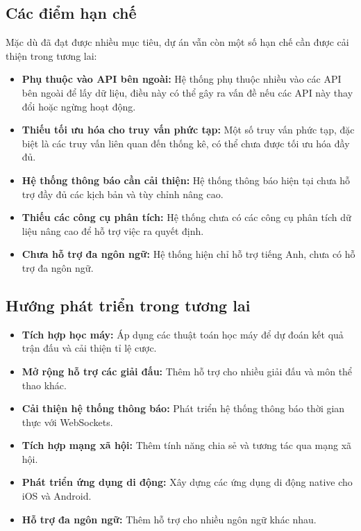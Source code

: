 \documentclass[a4paper,12pt]{report}
\begin{document}
\subsection{Các điểm hạn chế}

Mặc dù đã đạt được nhiều mục tiêu, dự án vẫn còn một số hạn chế cần được cải thiện trong tương lai:

\begin{itemize}
    \item \textbf{Phụ thuộc vào API bên ngoài:} Hệ thống phụ thuộc nhiều vào các API bên ngoài để lấy dữ liệu, điều này có thể gây ra vấn đề nếu các API này thay đổi hoặc ngừng hoạt động.
    \item \textbf{Thiếu tối ưu hóa cho truy vấn phức tạp:} Một số truy vấn phức tạp, đặc biệt là các truy vấn liên quan đến thống kê, có thể chưa được tối ưu hóa đầy đủ.
    \item \textbf{Hệ thống thông báo cần cải thiện:} Hệ thống thông báo hiện tại chưa hỗ trợ đầy đủ các kịch bản và tùy chỉnh nâng cao.
    \item \textbf{Thiếu các công cụ phân tích:} Hệ thống chưa có các công cụ phân tích dữ liệu nâng cao để hỗ trợ việc ra quyết định.
    \item \textbf{Chưa hỗ trợ đa ngôn ngữ:} Hệ thống hiện chỉ hỗ trợ tiếng Anh, chưa có hỗ trợ đa ngôn ngữ.
\end{itemize}

\subsection{Hướng phát triển trong tương lai}

\begin{itemize}
    \item \textbf{Tích hợp học máy:} Áp dụng các thuật toán học máy để dự đoán kết quả trận đấu và cải thiện tỉ lệ cược.
    \item \textbf{Mở rộng hỗ trợ các giải đấu:} Thêm hỗ trợ cho nhiều giải đấu và môn thể thao khác.
    \item \textbf{Cải thiện hệ thống thông báo:} Phát triển hệ thống thông báo thời gian thực với WebSockets.
    \item \textbf{Tích hợp mạng xã hội:} Thêm tính năng chia sẻ và tương tác qua mạng xã hội.
    \item \textbf{Phát triển ứng dụng di động:} Xây dựng các ứng dụng di động native cho iOS và Android.
    \item \textbf{Hỗ trợ đa ngôn ngữ:} Thêm hỗ trợ cho nhiều ngôn ngữ khác nhau.
\end{itemize}
\end{document}
